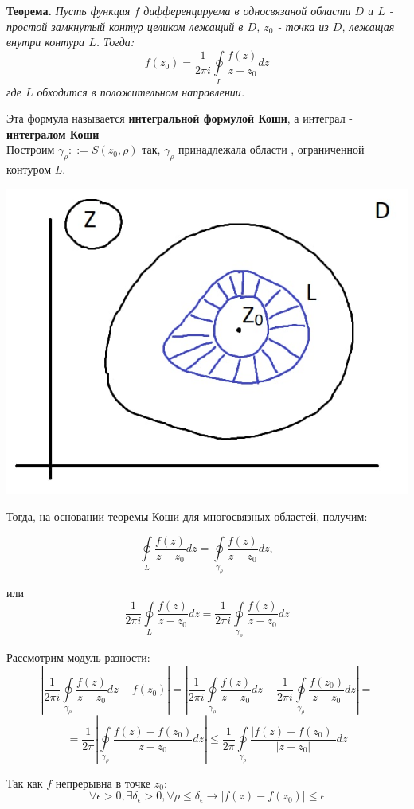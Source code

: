 \documentclass[a4paper, 12pt]{report}
\begin{document}
\par\bigskip

\textbf{Теорема.} \quad
\textit{Пусть функция $f$ дифференцируема в односвязаной области $D$ и $L$ - простой замкнутый контур целиком лежащий в $D$, $z_0$ - точка из $D$, лежащая внутри контура $L$. Тогда:}
\[
    f(z_0) = \frac{1}{2\pi i}\oint\limits_{L}\frac{f(z)}{z-z_0}dz
\]
\textit{где $L$ обходится в положительном направлении.}

Эта формула называется \textbf{интегральной формулой Коши}, а интеграл - \textbf{интегралом Коши}\\
\blacklozenge \hspace{4 mm}
Построим $\gamma_\rho ::= S(z_0, \rho)$ так, $\gamma_\rho$ принадлежала области , ограниченной контуром $L$.
\begin{center}
\includegraphics[width=0.5\linewidth]{complex1}
    
\end{center}

Тогда, на основании теоремы Коши для многосвязных областей, получим:


\[
    \oint\limits_{L}\frac{f(z)}{z-z_0}dz = \oint\limits_{\gamma_\rho}\frac{f(z)}{z-z_0}dz,
\]
\par или
\[
    \frac{1}{2\pi i}\oint\limits_{L}\frac{f(z)}{z-z_0}dz = \frac{1}{2\pi i}\oint\limits_{\gamma_\rho}\frac{f(z)}{z-z_0}dz
\]

Рассмотрим модуль разности:
\[
    |\frac{1}{2\pi i}\oint\limits_{\gamma_\rho}\frac{f(z)}{z-z_0}dz - f(z_0)| = |\frac{1}{2\pi i}\oint\limits_{\gamma_\rho}\frac{f(z)}{z-z_0}dz - \frac{1}{2\pi i}\oint\limits_{\gamma_\rho}\frac{f(z_0)}{z-z_0}dz| =
\]
\[
    = \frac{1}{2\pi}|\oint\limits_{\gamma_\rho}\frac{f(z)-f(z_0)}{z-z_0}dz| \leq 
    \frac{1}{2\pi}\oint\limits_{\gamma_\rho}\frac{|f(z)-f(z_0)|}{|z-z_0|}dz
\]

Так как $f$ непрерывна в точке $z_0$:
\[
    \forall \epsilon > 0, \exists \delta_\epsilon > 0, \forall \rho \leq \delta_\epsilon \rightarrow |f(z)-f(z_0)| \leq \epsilon
\]
\end{document}
